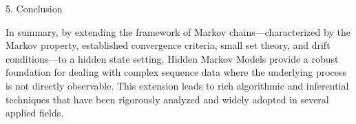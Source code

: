 \documentclass[12pt,a4paper]{article}
\begin{document}
5. Conclusion

In summary, by extending the framework of Markov chains—characterized by the Markov property, established convergence criteria, small set theory, and drift conditions—to a hidden state setting, Hidden Markov Models provide a robust foundation for dealing with complex sequence data where the underlying process is not directly observable. This extension leads to rich algorithmic and inferential techniques that have been rigorously analyzed and widely adopted in several applied fields.
\end{document}
